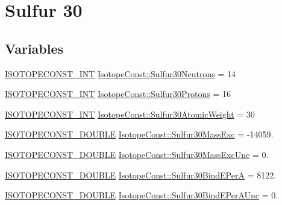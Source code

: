 \hypertarget{group___isotope_const-_sulfur-_s30}{}\section{Sulfur 30}
\label{group___isotope_const-_sulfur-_s30}
\subsection*{Variables}
\begin{DoxyCompactItemize}
\item 
\mbox{\hyperlink{group___isotope_const-_macros_ga5f18360b3e99483a35c32d789e62621c}{I\+S\+O\+T\+O\+P\+E\+C\+O\+N\+S\+T\+\_\+\+I\+NT}} \mbox{\hyperlink{group___isotope_const-_sulfur-_s30_gad9064471f5ec5a5c05693a62108da4d9}{Isotope\+Const\+::\+Sulfur30\+Neutrons}} = 14
\item 
\mbox{\hyperlink{group___isotope_const-_macros_ga5f18360b3e99483a35c32d789e62621c}{I\+S\+O\+T\+O\+P\+E\+C\+O\+N\+S\+T\+\_\+\+I\+NT}} \mbox{\hyperlink{group___isotope_const-_sulfur-_s30_gad4510004721bf18eac8aa67b05dce254}{Isotope\+Const\+::\+Sulfur30\+Protons}} = 16
\item 
\mbox{\hyperlink{group___isotope_const-_macros_ga5f18360b3e99483a35c32d789e62621c}{I\+S\+O\+T\+O\+P\+E\+C\+O\+N\+S\+T\+\_\+\+I\+NT}} \mbox{\hyperlink{group___isotope_const-_sulfur-_s30_ga56f8f75703c0efa21e21c24bcdac7247}{Isotope\+Const\+::\+Sulfur30\+Atomic\+Weight}} = 30
\item 
\mbox{\hyperlink{group___isotope_const-_macros_ga8f45a7272ce02c0b4c65c44636ed719a}{I\+S\+O\+T\+O\+P\+E\+C\+O\+N\+S\+T\+\_\+\+D\+O\+U\+B\+LE}} \mbox{\hyperlink{group___isotope_const-_sulfur-_s30_ga4aa7736b6712a14095f1ea23b2f5d1d7}{Isotope\+Const\+::\+Sulfur30\+Mass\+Exc}} = -\/14059.
\item 
\mbox{\hyperlink{group___isotope_const-_macros_ga8f45a7272ce02c0b4c65c44636ed719a}{I\+S\+O\+T\+O\+P\+E\+C\+O\+N\+S\+T\+\_\+\+D\+O\+U\+B\+LE}} \mbox{\hyperlink{group___isotope_const-_sulfur-_s30_ga39b096eb7991304017a7e51cc1234b4f}{Isotope\+Const\+::\+Sulfur30\+Mass\+Exc\+Unc}} = 0.
\item 
\mbox{\hyperlink{group___isotope_const-_macros_ga8f45a7272ce02c0b4c65c44636ed719a}{I\+S\+O\+T\+O\+P\+E\+C\+O\+N\+S\+T\+\_\+\+D\+O\+U\+B\+LE}} \mbox{\hyperlink{group___isotope_const-_sulfur-_s30_ga3371da16a71349f2eafa48a01a8c6d05}{Isotope\+Const\+::\+Sulfur30\+Bind\+E\+PerA}} = 8122.
\item 
\mbox{\hyperlink{group___isotope_const-_macros_ga8f45a7272ce02c0b4c65c44636ed719a}{I\+S\+O\+T\+O\+P\+E\+C\+O\+N\+S\+T\+\_\+\+D\+O\+U\+B\+LE}} \mbox{\hyperlink{group___isotope_const-_sulfur-_s30_gace4f7f408e51078e04007e891153fa96}{Isotope\+Const\+::\+Sulfur30\+Bind\+E\+Per\+A\+Unc}} = 0.

\end{DoxyCompactItemize}
